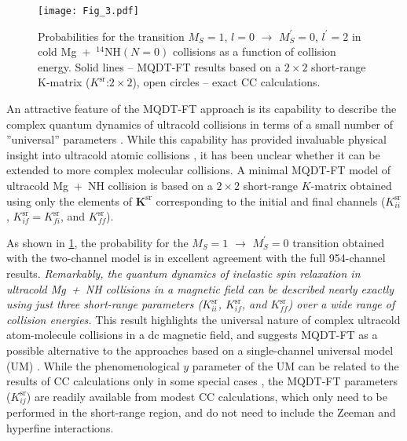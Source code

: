 \documentclass[reprint,amssymb,noeprint,twocolumn,longbibliography]{revtex4-2}
\begin{document}
 
\begin{figure}[t]
\begin{center}
\texttt{[image: Fig\_3.pdf]}
\end{center}
\vspace{-0.15cm}
\caption{Probabilities for the transition $M_S=1$, $l=0$ $\to$ 
$M^\prime_S=0$,
$l^\prime=2$ in cold Mg~+~$^{14}$NH$(N=0)$ collisions as a function of collision energy. Solid lines -- MQDT-FT results based on a $2\times2$ short-range K-matrix ($K^\text{sr}$:$2\times2$), open circles -- exact CC calculations. 
}
\label{Fig_3}
\end{figure}


An attractive feature of the MQDT-FT approach is its capability to describe the complex quantum dynamics of ultracold collisions in terms of a small number of ''universal'' parameters \cite{Burke_99,Gao_05}.  While this capability has provided invaluable physical insight into ultracold atomic collisions  \cite{Burke_99,Gao_05}, it has been unclear whether it can be extended to more complex molecular collisions. 
A minimal MQDT-FT model of ultracold Mg~+~NH collision is based on a $2\times 2$ short-range $K$-matrix obtained 
using only the elements of $\bm{K}^\text{sr}$ corresponding to the initial and final channels ($K_{ii}^\text{sr}$, $K_{if}^\text{sr}=K_{fi}^\text{sr}$, and $K_{ff}^\text{sr}$).
 

As shown in \cref{Fig_3}, the probability for the $M_S=1$ $\to$ $M^\prime_S=0$ transition obtained with the two-channel model is in excellent agreement with the full 954-channel results. {\it Remarkably, the quantum dynamics of inelastic spin relaxation in ultracold Mg~+~NH collisions in a magnetic field can be described nearly exactly using just three short-range parameters ($K_{ii}^\text{sr}$, $K_{if}^\text{sr}$, and $K_{ff}^\text{sr}$) over a wide range of collision energies.} 
This result highlights the universal nature of complex ultracold atom-molecule collisions in a dc magnetic field, and suggests MQDT-FT as a possible alternative to the approaches based on a single-channel universal model (UM) \cite{Idziaszek_10,Frye_15}.
While the phenomenological $y$ parameter of the UM can be related to the results of CC calculations only in some special cases \cite{Frye_15}, the MQDT-FT parameters 
(${K}^\text{sr}_{ij}$)
are readily available from modest CC calculations, which only need to be performed in the short-range region, and do not need to include the Zeeman and hyperfine interactions. 
\end{document}
